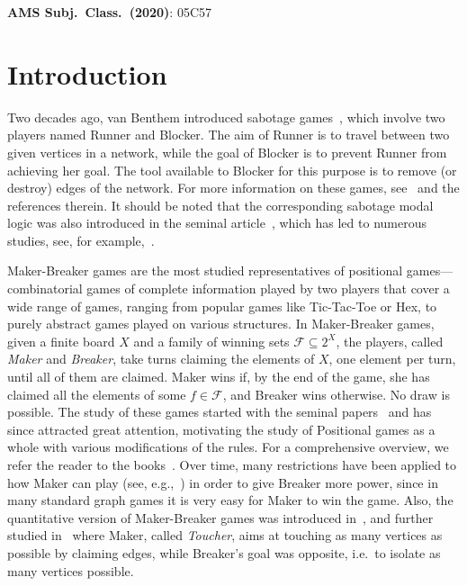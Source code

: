 \documentclass[12pt]{article}
\newcommand{\cF}{\mathcal{F}}
\DeclareMathOperator{\sab}{\mathrm{sab}}
\begin{document}
\noindent
{\bf AMS Subj.\ Class.\ (2020)}: 05C57

\section{Introduction}


Two decades ago, van Benthem introduced sabotage games~\cite{bentham-2005}, which involve two players named Runner and Blocker. The aim of Runner is to travel between two given vertices in a network, while the goal of Blocker is to prevent Runner from achieving her goal. The tool available to Blocker for this purpose is to remove (or destroy) edges of the network. For more information on these games, see~\cite{bentham-2026, kvasov-2016, mierzewski-2026, raju-2026} and the references therein. It should be noted that the corresponding sabotage modal logic was also introduced in the seminal  article~\cite{bentham-2005}, which has led to numerous studies, see, for example,~\cite{abou-2024, aucher-2018}.

Maker-Breaker games are the most studied representatives of positional games---combinatorial games of complete information played by two players that cover a wide range of games, ranging from popular games like Tic-Tac-Toe or Hex, to purely abstract games played on various structures. In Maker-Breaker games, given a finite board $X$ and a family of winning sets $\cF \subseteq 2^X$, the players, called \emph{Maker} and \emph{Breaker}, take turns claiming the elements of $X$, one element per turn, until all of them are claimed. Maker wins if, by the end of the game, she has claimed all the elements of some $f\in \cF$, and Breaker wins otherwise. No draw is possible. The study of these games started with the seminal papers~\cite{chvatal-1978,erdos-1973} and has since attracted great attention, motivating the study of Positional games as a whole with various modifications of the rules. For a comprehensive overview, we refer the reader to the books~\cite{beck-2008,hefetz-2014}. Over time, many restrictions have been applied to how Maker can play (see, e.g.,~\cite{chvatal-1978,clemens-2021,espig-2015,london-2018,seress-1999}) in order to give Breaker more power, since in many standard graph games it is very easy for Maker to win the game. Also, the quantitative version of Maker-Breaker games was introduced in~\cite{dowden-2019}, and further studied in~\cite{boriboon-2022,raty-2020} where Maker, called \textit{Toucher}, aims at touching as many vertices as possible by claiming edges, while Breaker's goal was opposite, i.e.\ to isolate as many vertices possible. 
\end{document}
